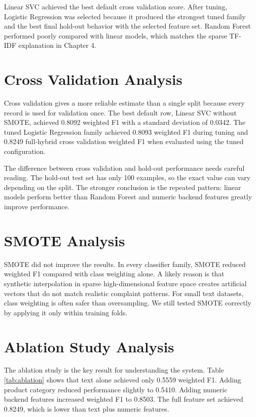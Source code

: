 \documentclass[12pt,a4paper,openany]{book}
\begin{document}
Linear SVC achieved the best default cross validation score. After tuning, Logistic Regression was selected because it produced the strongest tuned family and the best final hold-out behavior with the selected feature set. Random Forest performed poorly compared with linear models, which matches the sparse TF-IDF explanation in Chapter 4.

\section{Cross Validation Analysis}
Cross validation gives a more reliable estimate than a single split because every record is used for validation once. The best default row, Linear SVC without SMOTE, achieved 0.8092 weighted F1 with a standard deviation of 0.0342. The tuned Logistic Regression family achieved 0.8093 weighted F1 during tuning and 0.8249 full-hybrid cross validation weighted F1 when evaluated using the tuned configuration.

The difference between cross validation and hold-out performance needs careful reading. The hold-out test set has only 100 examples, so the exact value can vary depending on the split. The stronger conclusion is the repeated pattern: linear models perform better than Random Forest and numeric backend features greatly improve performance.

\section{SMOTE Analysis}
SMOTE did not improve the results. In every classifier family, SMOTE reduced weighted F1 compared with class weighting alone. A likely reason is that synthetic interpolation in sparse high-dimensional feature space creates artificial vectors that do not match realistic complaint patterns. For small text datasets, class weighting is often safer than oversampling. We still tested SMOTE correctly by applying it only within training folds.

\section{Ablation Study Analysis}
The ablation study is the key result for understanding the system. Table \ref{tab:ablation} shows that text alone achieved only 0.5559 weighted F1. Adding product category reduced performance slightly to 0.5410. Adding numeric backend features increased weighted F1 to 0.8503. The full feature set achieved 0.8249, which is lower than text plus numeric features.
\end{document}
